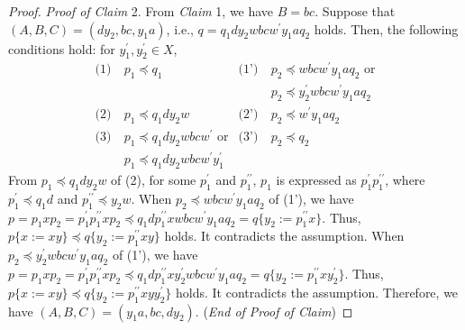 \begin{proof}
  \smallskip
  \noindent
  \textit{Proof of Claim} 2.
  From \textit{Claim} 1, we have $B=bc$. Suppose that $(A, B, C) = (dy_{2}, bc, y_{1}a)$, i.e., $q = q_{1}dy_{2}wbcw^{\prime}y_{1}aq_{2} $ holds. Then, the following conditions hold: for $y_{1}^{\prime},y_{2}^{\prime}\in X$,
  \begin{align*}
  \textrm{(1)}~& p_{1} \preceq q_{1} & \textrm{(1')}~& p_{2} \preceq wbcw^{\prime}y_{1}aq_{2}\mbox{ or}\\
  & & & p_{2} \preceq y_{2}^{\prime}wbcw^{\prime}y_{1}aq_{2}\\
  \textrm{(2)}~& p_{1} \preceq q_{1}dy_{2}w & \textrm{(2')}~& p_{2} \preceq w^{\prime}y_{1}aq_{2} \\
  \textrm{(3)}~& p_{1} \preceq q_{1}dy_{2}wbcw^{\prime}\mbox{ or} & \textrm{(3')}~& p_{2} \preceq q_{2}\\
  & p_{1} \preceq q_{1}dy_{2}wbcw^{\prime}y_{1}^{\prime}& &
  \end{align*}
  From $p_{1} \preceq q_{1}dy_{2}w$ of (2), for some $p^{\prime}_{1}$ and $p^{\prime\prime}_{1}$, $p_{1}$ is expressed as $p^{\prime}_{1}p^{\prime\prime}_{1}$, where $p^{\prime}_{1} \preceq q_{1}d$ and $p^{\prime\prime}_{1} \preceq y_{2}w$. 
  When $p_{2} \preceq wbcw^{\prime}y_{1}aq_{2}$ of (1'), we have $p=p_{1}xp_{2}=p^{\prime}_{1}p^{\prime\prime}_{1}xp_{2} \preceq q_{1}dp^{\prime\prime}_{1}xwbcw^{\prime}y_{1}aq_{2}=q \{ y_{2}:=p^{\prime\prime}_{1}x \}$. Thus, $p \{ x := xy \} \preceq q \{ y_{2}:=p^{\prime\prime}_{1}xy \}$ holds. It contradicts the assumption.
  When $p_{2} \preceq y_{2}^{\prime}wbcw^{\prime}y_{1}aq_{2}$ of (1'), we have $p=p_{1}xp_{2}=p^{\prime}_{1}p^{\prime\prime}_{1}xp_{2} \preceq q_{1}dp^{\prime\prime}_{1}xy_{2}^{\prime}wbcw^{\prime}y_{1}aq_{2}=q \{ y_{2}:=p^{\prime\prime}_{1}xy_{2}^{\prime} \}$.
  Thus, $p \{ x := xy \} \preceq q \{ y_{2}:=p^{\prime\prime}_{1}xyy_{2}^{\prime} \}$ holds. It contradicts the assumption.
  Therefore, we have $(A, B, C) = (y_{1}a, bc, dy_{2})$.
  (\textit{End of Proof of Claim})


\end{proof}
